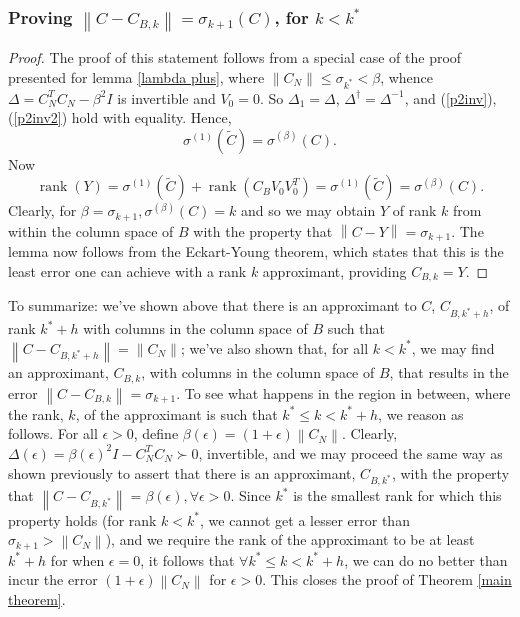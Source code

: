 \documentclass[11pt]{article}
\newcommand{\rank}{\operatorname{rank}}
\newcommand{\norm}[1]{\left\|#1\right\|}
\begin{document}
\subsubsection{Proving $\norm{C - C_{B, k}} = \sigma_{k+1}(C)$, for $k < k^*$}
%
\begin{proof}
The proof of this statement follows from a special case of the proof presented for lemma \ref{lambda plus}, where $\norm{C_N} \leq \sigma_{k^*} < \beta$, whence $\Delta = C_N ^T C_N - \beta^2 I$ is invertible and $V_0 = 0$. So $\Delta_1 = \Delta$,  $\Delta^{\dagger} = \Delta^{-1}$, and (\ref{p2inv}), (\ref{p2inv2}) hold with equality. Hence, 
\[ \sigma^{(1)} (\tilde C) = \sigma^{(\beta)} (C). \]
Now 
\[ \rank(Y) = \sigma^{(1)} (\tilde C) + \rank(C_B V_0 V_0 ^T) = \sigma^{(1)} (\tilde C) = \sigma^{(\beta)} (C). \] 
Clearly, for $\beta = \sigma_{k+1}, \sigma^{(\beta)}(C) = k$ and so we may obtain $Y$ of rank $k$ from within the column space of $B$ with the property that $\norm{C - Y} = \sigma_{k+1}$. The lemma now follows from the Eckart-Young theorem, which states that this is the least error one can achieve with a rank $k$ approximant, providing $C_{B, k} = Y$.
\end{proof}
%
%
\noindent To summarize: we've shown above that there is an approximant to $C$, $C_{B, k^* + h}$, of rank $k^* + h$ with columns in the column space of $B$ such that $\norm{C - C_{B, k^* + h}} = \norm{C_N}$; we've also shown that, for all $k < k^*$, we may find an approximant, $C_{B, k}$, with columns in the column space of $B$, that results in the error $\norm{C - C_{B, k}} = \sigma_{k+1}$. To see what happens in the region in between, where the rank, $k$, of the approximant is such that $k^* \leq k < k^* + h$, we reason as follows. For all $\epsilon > 0$, define $\beta(\epsilon) = (1 + \epsilon) \norm{C_N}$. Clearly, $\Delta(\epsilon) = \beta(\epsilon) ^2 I - C_N ^T C_N \succ  0$, invertible, and we may proceed the same way as shown previously to assert that there is an approximant, $C_{B, k^*}$, with the property that $\norm{C - C_{B, k^*}} = \beta(\epsilon), \forall \epsilon > 0$. Since $k^*$ is the smallest rank for which this property holds (for rank $ k < k^*$, we cannot get a lesser error than $\sigma_{k+1} > \norm{C_N}$), and we require the rank of the approximant to be at least $k^* + h$ for when $\epsilon = 0$, it follows that $\forall k^* \leq k < k^* + h$, we can do no better than incur the error $(1 + \epsilon) \norm{C_N}$ for $\epsilon > 0$. This closes the proof of Theorem \ref{main theorem}.
\end{document}
